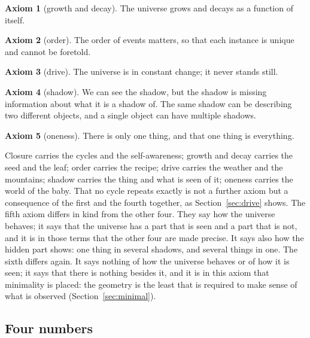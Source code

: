 \documentclass[11pt,a4paper]{article}
\theoremstyle{plain}
\theoremstyle{definition}
\newtheorem{axiom}{Axiom}
\theoremstyle{remark}
\begin{document}
\begin{axiom}[growth and decay]\label{ax:A2}
The universe grows and decays as a function of itself.
\end{axiom}

\begin{axiom}[order]\label{ax:A3}
The order of events matters, so that each instance is unique and cannot be foretold.
\end{axiom}

\begin{axiom}[drive]\label{ax:A4}
The universe is in constant change; it never stands still.
\end{axiom}

\begin{axiom}[shadow]\label{ax:A5}
We can see the shadow, but the shadow is missing information about what it is a shadow of. The same shadow can be describing two different objects, and a single object can have multiple shadows.
\end{axiom}

\begin{axiom}[oneness]\label{ax:A6}
There is only one thing, and that one thing is everything.
\end{axiom}

Closure carries the cycles and the self-awareness; growth and decay carries the seed and the leaf; order carries the recipe; drive carries the weather and the mountains; shadow carries the thing and what is seen of it; oneness carries the world of the baby. That no cycle repeats exactly is not a further axiom but a consequence of the first and the fourth together, as Section~\ref{sec:drive} shows. The fifth axiom differs in kind from the other four. They say how the universe behaves; it says that the universe has a part that is seen and a part that is not, and it is in those terms that the other four are made precise. It says also how the hidden part shows: one thing in several shadows, and several things in one. The sixth differs again. It says nothing of how the universe behaves or of how it is seen; it says that there is nothing besides it, and it is in this axiom that minimality is placed: the geometry is the least that is required to make sense of what is observed (Section~\ref{sec:minimal}).

\subsection{Four numbers}\label{sec:numbers}
\end{document}
